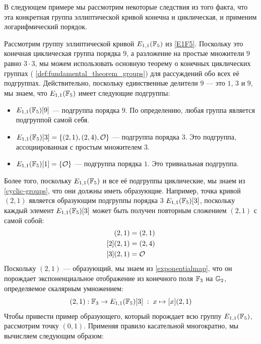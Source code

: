 В следующем примере мы рассмотрим некоторые следствия из того факта, что эта конкретная группа эллиптической кривой конечна и циклическая, и применим логарифмический порядок.
\begin{example}\label{ex:G1G2-subgroups} Рассмотрим группу эллиптической кривой $E_{1,1}(\mathbb{F}_5)$ из \examplename{} \ref{E1F5}. Поскольку это конечная циклическая группа порядка $9$, а разложение на простые множители $9$ равно $3\cdot 3$, мы можем использовать основную теорему о конечных циклических группах ( \ref{def:fundamental_theorem_groups}) для рассуждений обо всех её подгруппах. Действительно, поскольку единственные делители $9$ — это $1$, $3$ и $9$, мы знаем, что $E_{1,1}(\mathbb{F}_5)$ имеет следующие подгруппы:
\begin{itemize}
\item $E_{1,1}(\mathbb{F}_5)[9]$ — подгруппа порядка $9$. По определению, любая группа является подгруппой самой себя.
\item $E_{1,1}(\mathbb{F}_5)[3] = \{(2,1),(2,4),\mathcal{O}\}$ — подгруппа порядка $3$. Это подгруппа, ассоциированная с простым множителем $3$.
\item $E_{1,1}(\mathbb{F}_5)[1] = \{\mathcal{O}\}$ — подгруппа порядка $1$. Это тривиальная подгруппа.
\end{itemize}
Более того, поскольку $E_{1,1}(\mathbb{F}_5)$ и все её подгруппы циклические, мы знаем из  \ref{cyclic-groups}, что они должны иметь образующие. Например, точка кривой $(2,1)$ является образующим подгруппы порядка $3$ $E_{1,1}(\mathbb{F}_5)[3]$, поскольку каждый элемент $E_{1,1}(\mathbb{F}_5)[3]$ может быть получен повторным сложением $(2,1)$ с самой собой: 
\begin{align*}
[1](2,1) & = (2,1) \\
[2](2,1) & = (2,4) \\
[3](2,1) & = \Oinf
\end{align*}
Поскольку $(2,1)$ — образующий, мы знаем из \eqref{exponentialmap}, что он порождает экспоненциальное отображение из конечного поля $\mathbb{F}_3$ на $\mathbb{G}_2$, определяемое скалярным умножением:
\begin{equation}
[\cdot](2,1): \F_3 \to E_{1,1}(\F_5)[3]\; : \; x\mapsto [x](2,1) 
\end{equation}
Чтобы привести пример образующего, который порождает всю группу $E_{1,1}(\mathbb{F}_5)$, рассмотрим точку $(0,1)$. Применяя правило касательной многократно, мы вычисляем следующим образом:
\begin{equation}
\begin{array}{lccr}
{}\begin{array}{lcl}

\end{array}
\end{array}
\end{equation}
\end{example}

